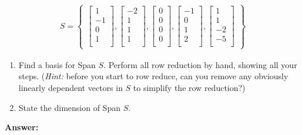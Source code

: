 \documentclass[10pt,letterpaper,final]{report}
\begin{document}
\begin{align*}
  S = \begin{Bmatrix}
        \begin{bmatrix}
          1  \\
          -1 \\
          0  \\
          1  \\
        \end{bmatrix},
        \begin{bmatrix}
          -2 \\
          1  \\
          1  \\
          1  \\
        \end{bmatrix},
        \begin{bmatrix}
          0 \\
          0 \\
          0 \\
          0 \\
        \end{bmatrix},
        \begin{bmatrix}
          -1 \\
          0  \\
          1  \\
          2  \\
        \end{bmatrix},
        \begin{bmatrix}
          1  \\
          1  \\
          -2 \\
          -5 \\
        \end{bmatrix}
      \end{Bmatrix}
\end{align*}

\begin{enumerate}[label=(\alph*)]
  \item Find a basis for Span $S$. Perform all row reduction by hand, showing all your steps. (\emph{Hint:} before you start to row reduce, can you remove any obviously linearly dependent vectors in $S$ to simplify the row reduction?)
  \item State the dimension of Span $S$.
\end{enumerate}

\medskip
\noindent\textbf{Answer:}
\medskip
\end{document}
